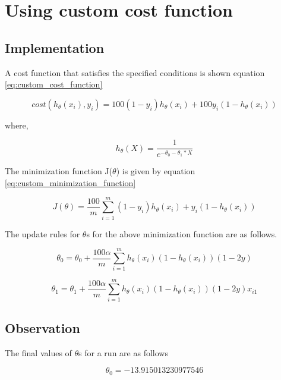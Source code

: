 \section{Using custom cost function}

\subsection{Implementation}
A cost function that satisfies the specified conditions is shown equation \ref{eq:custom_cost_function}

\begin{equation}
\label{eq:custom_cost_function}
cost(h_{\theta}(x_i), y_i) = 100(1-y_i)h_{\theta}(x_i) + 100y_i(1-h_{\theta}(x_i))
\end{equation}

where,

\begin{equation}
\label{eq:logistic_regression}
h_{\theta}(X) = \frac{1}{e^{-\theta_0 - \theta_1 * X}}
\end{equation}

The minimization function J($\theta$) is given by equation \ref{eq:custom_minimization_function}

\begin{equation}
\label{eq:custom_minimization_function}
J(\theta) = \frac{100}{m} \sum_{i=1}^{m}(1-y_i)h_{\theta}(x_i) + y_i(1-h_{\theta}(x_i))
\end{equation}

The update rules for $\theta$s for the above minimization function are as follows.

\begin{equation}
\label{eq:theta_0_update}
\theta_0 = \theta_0 + \frac{100\alpha}{m}\sum_{i=1}^{m}h_\theta(x_i)(1-h_\theta(x_i))(1-2y)
\end{equation}

\begin{equation}
\label{eq:theta_1_update}
\theta_1 = \theta_1 + \frac{100\alpha}{m}\sum_{i=1}^{m}h_\theta(x_i)(1-h_\theta(x_i))(1-2y)x_{i1}
\end{equation}

\subsection{Observation}
The final values of $\theta$s for a run are as follows

\begin{equation}
\theta_0 = -13.915013230977546
\end{equation}

